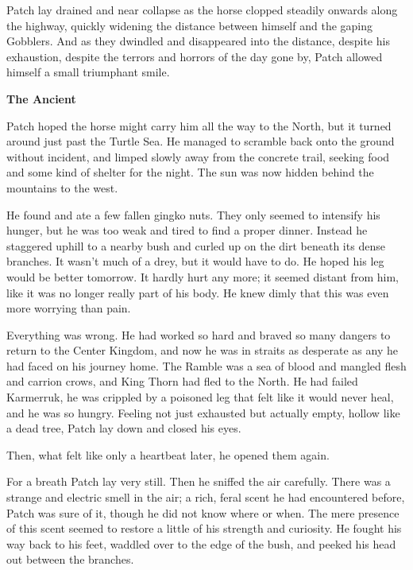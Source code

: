 \documentclass[11pt]{article}
\begin{document}
 Patch lay drained and near collapse as the horse clopped steadily onwards along the highway, quickly widening the distance between himself and the gaping Gobblers. And as they dwindled and disappeared into the distance, despite his exhaustion, despite the terrors and horrors of the day gone by, Patch allowed himself a small triumphant smile.\par
\par
{\bf The Ancient\par
}\par
 Patch hoped the horse might carry him all the way to the North, but it turned around just past the Turtle Sea. He managed to scramble back onto the ground without incident, and limped slowly away from the concrete trail, seeking food and some kind of shelter for the night. The sun was now hidden behind the mountains to the west.\par
 He found and ate a few fallen gingko nuts. They only seemed to intensify his hunger, but he was too weak and tired to find a proper dinner. Instead he staggered uphill to a nearby bush and curled up on the dirt beneath its dense branches. It wasn't much of a drey, but it would have to do. He hoped his leg would be better tomorrow. It hardly hurt any more; it seemed distant from him, like it was no longer really part of his body. He knew dimly that this was even more worrying than pain.\par
 Everything was wrong. He had worked so hard and braved so many dangers to return to the Center Kingdom, and now he was in straits as desperate as any he had faced on his journey home. The Ramble was a sea of blood and mangled flesh and carrion crows, and King Thorn had fled to the North. He had failed Karmerruk, he was crippled by a poisoned leg that felt like it would never heal, and he was so hungry. Feeling not just exhausted but actually empty, hollow like a dead tree, Patch lay down and closed his eyes.\par
 Then, what felt like only a heartbeat later, he opened them again.\par
 For a breath Patch lay very still. Then he sniffed the air carefully. There was a strange and electric smell in the air; a rich, feral scent he had encountered before, Patch was sure of it, though he did not know where or when. The mere presence of this scent seemed to restore a little of his strength and curiosity. He fought his way back to his feet, waddled over to the edge of the bush, and peeked his head out between the branches.\par
\end{document}
